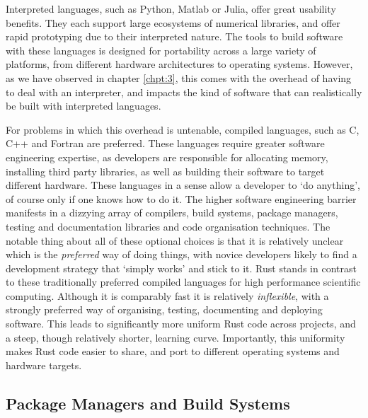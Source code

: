 Interpreted languages, such as Python, Matlab or Julia, offer great usability benefits. They each support large ecosystems of numerical libraries, and offer rapid prototyping due to their interpreted nature. The tools to build software with these languages is designed for portability across a large variety of platforms, from different hardware architectures to operating systems. However, as we have observed in chapter \ref{chpt:3}, this comes with the overhead of having to deal with an interpreter, and impacts the kind of software that can realistically be built with interpreted languages.

For problems in which this overhead is untenable, compiled languages, such as C, C++ and Fortran are preferred. These languages require greater software engineering expertise, as developers are responsible for allocating memory, installing third party libraries, as well as building their software to target different hardware. These languages in a sense allow a developer to `do anything', of course only if one knows how to do it. The higher software engineering barrier manifests in a dizzying array of compilers, build systems, package managers, testing and documentation libraries and code organisation techniques. The notable thing about all of these optional choices is that it is relatively unclear which is the \textit{preferred} way of doing things, with novice developers likely to find a development strategy that `simply works' and stick to it. Rust stands in contrast to these traditionally preferred compiled languages for high performance scientific computing. Although it is comparably fast it is relatively \textit{inflexible}, with a strongly preferred way of organising, testing, documenting and deploying software. This leads to significantly more uniform Rust code across projects, and a steep, though relatively shorter, learning curve. Importantly, this uniformity makes Rust code easier to share, and port to different operating systems and hardware targets.

\subsection*{Package Managers and Build Systems}


